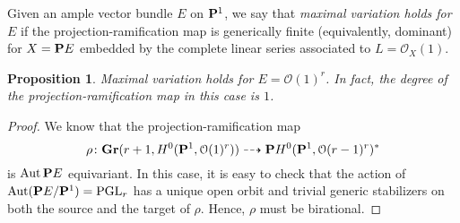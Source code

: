 \documentclass[11pt,reqno]{amsart}
\theoremstyle{plain}
\newtheorem{proposition}[theorem]{Proposition}
\theoremstyle{definition}
\theoremstyle{remark}
\numberwithin{equation}{section}
\numberwithin{equation}{section}
\renewcommand{\O}{\mathcal O}
\begin{document}
Given an ample vector bundle $E$ on $\P^1$, we say that \emph{maximal variation holds for $E$} if the projection-ramification map is generically finite (equivalently, dominant) for $X = \P E$ embedded by the complete linear series associated to $L = \O_X(1)$.

\begin{proposition}\label{prop:segre}
  Maximal variation holds for $E = \O(1)^r$.
  In fact, the degree of the projection-ramification map in this case is $1$.
\end{proposition}
\begin{proof}
  We know that the projection-ramification map
  \[ \rho \from \Gr(r+1, H^0(\P^1, \O(1)^r)) \dashrightarrow \P H^0(\P^1, \O(r-1)^r)^*\]
  is $\Aut \P E$ equivariant.
  In this case, it is easy to check that the action of $\Aut (\P E / \P^1) = \PGL_r$ has a unique open orbit and trivial generic stabilizers on both the source and the target of $\rho$.
  Hence, $\rho$ must be birational.  
\end{proof}
\end{document}
